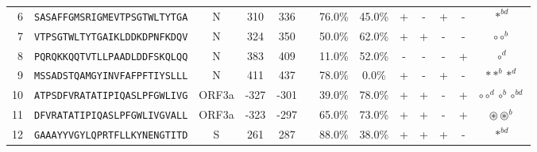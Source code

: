 \begin{tabular}{rcccccccccccc}
6  &  \texttt{SASAFFGMSRIGMEVTPSGTWLTYTGA} &       N &    310 &   336 &                &                          76.0\% &                           45.0\% &          + &           - &          + &           - &                                                                                                                            $ \ast^{bd} $ \\
7  &  \texttt{VTPSGTWLTYTGAIKLDDKDPNFKDQV} &       N &    324 &   350 &                &                          50.0\% &                           62.0\% &          + &           + &          - &           - &                                                                                                                        $ \circ \circ^b $ \\
8  &  \texttt{PQRQKKQQTVTLLPAADLDDFSKQLQQ} &       N &    383 &   409 &                &                          11.0\% &                           52.0\% &          - &           - &          - &           + &                                                                                                                              $ \circ^d $ \\
9  &  \texttt{MSSADSTQAMGYINVFAFPFTIYSLLL} &       N &    411 &   437 &                &                          78.0\% &                            0.0\% &          + &           - &          + &           - &                                                                                                                   $ \ast \ast^b \ast^d $ \\
10 &  \texttt{ATPSDFVRATATIPIQASLPFGWLIVG} &   ORF3a &   -327 &  -301 &                &                          39.0\% &                           78.0\% &          + &           + &          - &           + &                                                                                                     $ \circ \circ^d \circ^b \circ^{bd} $ \\
11 &  \texttt{DFVRATATIPIQASLPFGWLIVGVALL} &   ORF3a &   -323 &  -297 &                &                          65.0\% &                           73.0\% &          + &           + &          - &           + &                                                                                                            $ \circledast \circledast^b $ \\
12 &  \texttt{GAAAYYVGYLQPRTFLLKYNENGTITD} &       S &    261 &   287 &                &                          88.0\% &                           38.0\% &          + &           + &          + &           - &                                                                                                                            $ \ast^{bd} $ \\

\end{tabular}
